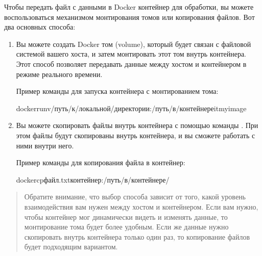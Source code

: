 \documentclass[letterpaper,10pt,russian]{sphinxmanual}
\begin{document}
\sphinxAtStartPar
Чтобы передать файл с данными в Docker контейнер для обработки, вы можете воспользоваться механизмом монтирования томов или копирования файлов. Вот два основных способа:
\begin{enumerate}
%
\item {} 
\sphinxAtStartPar
{}
Вы можете создать Docker том (volume), который будет связан с файловой системой вашего хоста, и затем монтировать этот том внутрь контейнера. Этот способ позволяет передавать данные между хостом и контейнером в режиме реального времени.

\sphinxAtStartPar
Пример команды для запуска контейнера с монтированием тома:

\begin{sphinxVerbatim}[commandchars=\\\{\}]
dockerrun\PYGZhy{}v/путь/к/локальной/директории:/путь/в/контейнере\PYGZhy{}itmy\PYGZus{}image
\end{sphinxVerbatim}

\item {} 
\sphinxAtStartPar
{}
Вы можете скопировать файлы внутрь контейнера с помощью команды . При этом файлы будут скопированы внутрь контейнера, и вы сможете работать с ними внутри него.

\sphinxAtStartPar
Пример команды для копирования файла в контейнер:

\begin{sphinxVerbatim}[commandchars=\\\{\}]
dockercpфайл.txtконтейнер:/путь/в/контейнере/
\end{sphinxVerbatim}

\end{enumerate}
\begin{quote}

\sphinxAtStartPar
Обратите внимание, что выбор способа зависит от того, какой уровень взаимодействия вам нужен между хостом и контейнером. Если вам нужно, чтобы контейнер мог динамически видеть и изменять данные, то монтирование тома будет более удобным. Если же данные нужно скопировать внутрь контейнера только один раз, то копирование файлов будет подходящим вариантом.
\end{quote}
\end{document}
